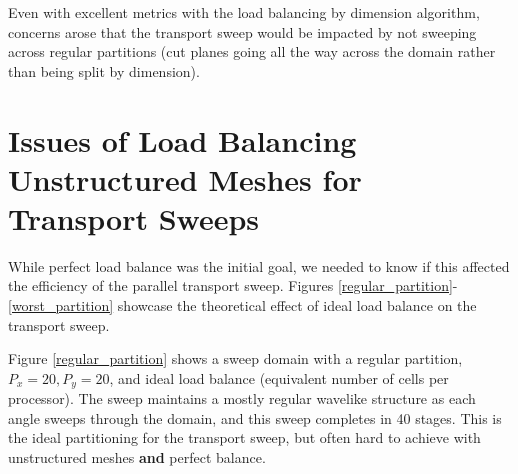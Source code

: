 \documentclass[11pt, letterpaper,titlepage,oneside]{article}
\begin{document}
Even with excellent metrics with the load balancing by dimension algorithm, concerns arose that the transport sweep would be impacted by not sweeping across regular partitions (cut planes going all the way across the domain rather than being split by dimension). 

\section{Issues of Load Balancing Unstructured Meshes for Transport Sweeps}

While perfect load balance was the initial goal, we needed to know if this affected the efficiency of the parallel transport sweep. Figures \ref{regular_partition}-\ref{worst_partition} showcase the theoretical effect of ideal load balance on the transport sweep.

Figure \ref{regular_partition} shows a sweep domain with a regular partition, $P_x = 20, P_y = 20$, and ideal load balance (equivalent number of cells per processor). The sweep maintains a mostly regular wavelike structure as each angle sweeps through the domain, and this sweep completes in 40 stages. This is the ideal partitioning for the transport sweep, but often hard to achieve with unstructured meshes \textbf{and} perfect balance.
\end{document}
